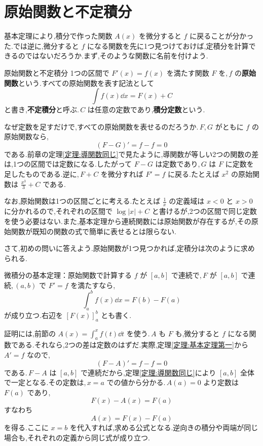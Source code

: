 \section{原始関数と不定積分}\label{節:原始関数基本定理}
基本定理により,積分で作った関数 $A(x)$ を微分すると $f$ に戻ることが分かった.では逆に,微分すると $f$ になる関数を先に1つ見つけておけば,定積分を計算できるのではないだろうか.まず,そのような関数に名前を付けよう.

\begin{definition}{原始関数と不定積分}
1つの区間で $F'(x)=f(x)$ を満たす関数 $F$ を,\,$f$ の\textbf{原始関数}という.すべての原始関数を表す記法として
\[
 \int f(x)\dd x=F(x)+C
\]
と書き,\textbf{不定積分}と呼ぶ.\,$C$ は任意の定数であり,\textbf{積分定数}という.
\end{definition}

なぜ定数を足すだけで,すべての原始関数を表せるのだろうか.\,$F,G$ がともに $f$ の原始関数なら,
\[
 (F-G)'=f-f=0
\]
である.前章の定理\ref{定理:導関数同じ}で見たように,導関数が等しい2つの関数の差は,1つの区間では定数になる.したがって $F-G$ は定数であり,\,$G$ は $F$ に定数を足したものである.逆に,\,$F+C$ を微分すれば $F'=f$ に戻る.たとえば $x^2$ の原始関数は $\frac{x^3}{3}+C$ である.

なお,原始関数は1つの区間ごとに考える.たとえば $\frac1x$ の定義域は $x<0$ と $x>0$ に分かれるので,それぞれの区間で $\log|x|+C$ と書けるが,2つの区間で同じ定数を使う必要はない.また,基本定理から連続関数には原始関数が存在するが,その原始関数が既知の関数の式で簡単に表せるとは限らない.

さて,初めの問いに答えよう.原始関数が1つ見つかれば,定積分は次のように求められる.

\begin{theorem}{微積分の基本定理：原始関数で計算する}\label{定理:基本定理第二}
$f$ が $[a,b]$ で連続で,\,$F$ が $[a,b]$ で連続,\,$(a,b)$ で $F'=f$ を満たすなら,
\[
 \int_a^b f(x)\dd x=F(b)-F(a)
\]
が成り立つ.右辺を $[F(x)]_a^b$ とも書く.
\end{theorem}

証明には,前節の $A(x)=\int_a^x f(t)\dd t$ を使う.\,$A$ も $F$ も,微分すると $f$ になる関数である.それなら,2つの差は定数のはずだ.実際,定理\ref{定理:基本定理第一}から $A'=f$ なので,
\[
 (F-A)'=f-f=0
\]
である.\,$F-A$ は $[a,b]$ で連続だから,定理\ref{定理:導関数同じ}により $[a,b]$ 全体で一定となる.その定数は,\,$x=a$ での値から分かる.\,$A(a)=0$ より定数は $F(a)$ であり,
\[
 F(x)-A(x)=F(a)
\]
すなわち
\[
 A(x)=F(x)-F(a)
\]
を得る.ここに $x=b$ を代入すれば,求める公式となる.逆向きの積分や両端が同じ場合も,それぞれの定義から同じ式が成り立つ.

